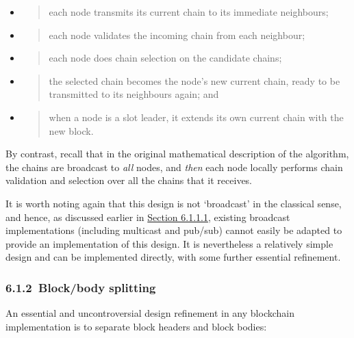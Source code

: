 \documentclass[11pt,a4paper]{article}
\begin{document}
\begin{itemize}
\item
  \begin{quote}
  each node transmits its current chain to its immediate neighbours;
  \end{quote}
\item
  \begin{quote}
  each node validates the incoming chain from each neighbour;
  \end{quote}
\item
  \begin{quote}
  each node does chain selection on the candidate chains;
  \end{quote}
\item
  \begin{quote}
  the selected chain becomes the node's new current chain, ready to be
  transmitted to its neighbours again; and
  \end{quote}
\item
  \begin{quote}
  when a node is a slot leader, it extends its own current chain with
  the new block.
  \end{quote}
\end{itemize}

By contrast, recall that in the original mathematical description of the
algorithm, the chains are broadcast to \emph{all} nodes, and \emph{then}
each node locally performs chain validation and selection over all the
chains that it receives.

It is worth noting again that this design is not `broadcast' in the
classical sense, and hence, as discussed earlier in
\protect\hyperlink{the-ouroboros-specification}{{Section 6.1.1.1}},
existing broadcast implementations (including multicast and pub/sub)
cannot easily be adapted to provide an implementation of this design. It
is nevertheless a relatively simple design and can be implemented
directly, with some further essential refinement.

\hypertarget{blockbody-splitting}{%
\subsubsection{​6.1.2​~Block/body splitting}\label{blockbody-splitting}}

An essential and uncontroversial design refinement in any blockchain
implementation is to separate block headers and block bodies:
\end{document}
